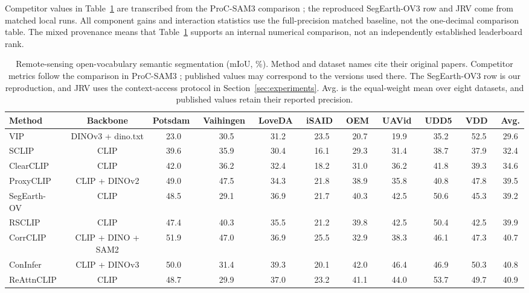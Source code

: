 Competitor values in Table~\ref{tab:main-comparison} are transcribed from the ProC-SAM3 comparison \cite{R12}; the reproduced SegEarth-OV3 row and JRV come from matched local runs. All component gains and interaction statistics use the full-precision matched baseline, not the one-decimal comparison table. The mixed provenance means that Table~\ref{tab:main-comparison} supports an internal numerical comparison, not an independently established leaderboard rank.


\begin{table}[!t]
\centering
\captionsetup{hypcap=false}
\caption{Remote-sensing open-vocabulary semantic segmentation (mIoU, \%). Method and dataset names cite their original papers. Competitor metrics follow the comparison in ProC-SAM3 \cite{R12}; published values may correspond to the versions used there. The SegEarth-OV3 row is our reproduction, and JRV uses the context-access protocol in Section~\ref{sec:experiments}. Avg. is the equal-weight mean over eight datasets, and published values retain their reported precision.}
\captionsetup{hypcap=true}
\label{tab:main-comparison}
\setlength{\tabcolsep}{2pt}
\scriptsize
\begin{tabular}{lcccccccccc}
\toprule
Method & Backbone & Potsdam~\cite{R42} & Vaihingen~\cite{R42} & LoveDA~\cite{R36} & iSAID~\cite{R37} & OEM~\cite{R38} & UAVid~\cite{R39} & UDD5~\cite{R40} & VDD~\cite{R41} & Avg. \\
\midrule
VIP~\cite{R32} & DINOv3 + dino.txt & 23.0 & 30.5 & 31.2 & 23.5 & 20.7 & 19.9 & 35.2 & 52.5 & 29.6 \\
SCLIP~\cite{R29} & CLIP & 39.6 & 35.9 & 30.4 & 16.1 & 29.3 & 31.4 & 38.7 & 37.9 & 32.4 \\
ClearCLIP~\cite{R30} & CLIP & 42.0 & 36.2 & 32.4 & 18.2 & 31.0 & 36.2 & 41.8 & 39.3 & 34.6 \\
ProxyCLIP~\cite{R31} & CLIP + DINOv2 & 49.0 & 47.5 & 34.3 & 21.8 & 38.9 & 35.8 & 40.8 & 47.8 & 39.5 \\
SegEarth-OV~\cite{R06} & CLIP & 48.5 & 29.1 & 36.9 & 21.7 & 40.3 & 42.5 & 50.6 & 45.3 & 39.2 \\
RSCLIP~\cite{R33} & CLIP & 47.4 & 40.3 & 35.5 & 21.2 & 39.8 & 42.5 & 50.4 & 42.5 & 39.9 \\
CorrCLIP~\cite{R34} & CLIP + DINO + SAM2 & 51.9 & 47.0 & 36.9 & 25.5 & 32.9 & 38.3 & 46.1 & 47.3 & 40.7 \\
ConInfer~\cite{R26} & CLIP + DINOv3 & 50.0 & 31.4 & 39.3 & 20.1 & 42.0 & 46.4 & 46.9 & 50.3 & 40.8 \\
ReAttnCLIP~\cite{R07} & CLIP & 48.7 & 29.9 & 37.0 & 23.2 & 41.1 & 44.0 & 53.7 & 49.7 & 40.9 \\

\end{tabular}
\end{table}
